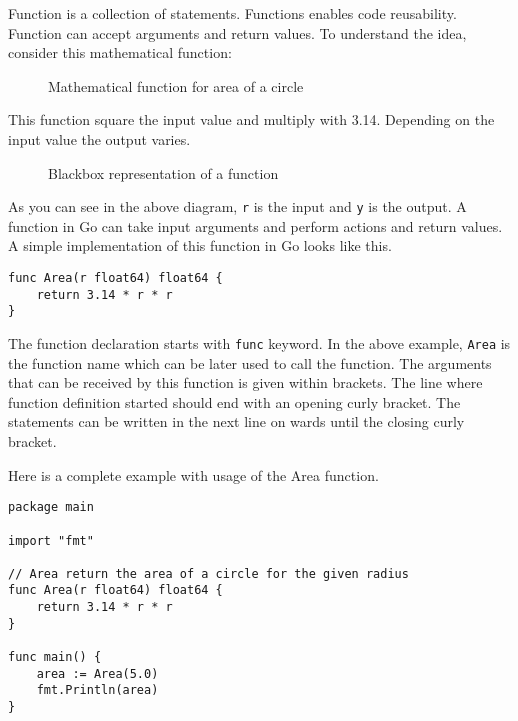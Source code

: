 Function is a collection of statements.  Functions
enables code reusability.  Function can accept arguments and return
values.  To understand the idea, consider this mathematical function:

\begin{figure}[h!]
\centering
{}
\caption{Mathematical function for area of a circle}
\end{figure}

This function square the input value and multiply with 3.14.
Depending on the input value the output varies.

\begin{figure}[h!]
\centering
{}
\caption{Blackbox representation of a function}
\end{figure}

As you can see in the above diagram, \texttt{r} is the input
and \texttt{y} is the output.  A function in Go can take input
arguments and perform actions and return values.  A simple
implementation of this function in Go looks like this.

\begin{lstlisting}[numbers=none]
func Area(r float64) float64 {
    return 3.14 * r * r
}
\end{lstlisting}

The function declaration starts with \texttt{func} keyword.  In the
above example, \texttt{Area} is the function name which can be later
used to call the function.  The arguments that can be received by this
function is given within brackets.  The line where function definition
started should end with an opening curly bracket.  The statements can
be written in the next line on wards until the closing curly bracket.

Here is a complete example with usage of the Area function.

\begin{lstlisting}[caption=Function usage]
package main

import "fmt"

// Area return the area of a circle for the given radius
func Area(r float64) float64 {
    return 3.14 * r * r
}

func main() {
    area := Area(5.0)
    fmt.Println(area)
}
\end{lstlisting}

